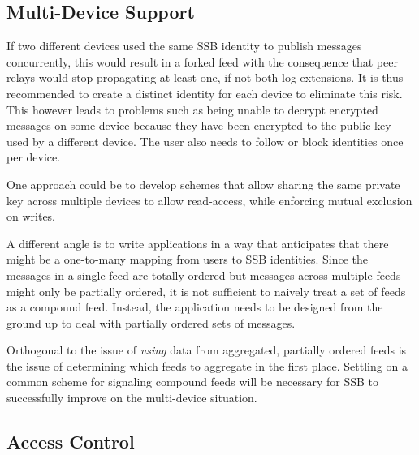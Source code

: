 \documentclass[10pt,sigconf]{acmart}
\begin{document}



\subsection{Multi-Device Support}

If two different devices used the same SSB identity to publish messages concurrently, this would result in a forked feed with the consequence that peer relays would stop propagating at least one, if not both log extensions. It is thus recommended to create a distinct identity for each device to eliminate this risk. This however leads to problems such as being unable to decrypt encrypted messages on some device because they have been encrypted to the public key used by a different device. The user also needs to follow or block identities once per device.

One approach could be to develop schemes that allow sharing the same private key across multiple devices to allow read-access, while enforcing mutual exclusion on writes.

A different angle is to write applications in a way that anticipates that there might be a one-to-many mapping from users to SSB identities. Since the messages in a single feed are totally ordered but messages across multiple feeds might only be partially ordered, it is not sufficient to naively treat a set of feeds as a compound feed. Instead, the application needs to be designed from the ground up to deal with partially ordered sets of messages.

Orthogonal to the issue of \textit{using} data from aggregated, partially ordered feeds is the issue of determining which feeds to aggregate in the first place. Settling on a common scheme for signaling compound feeds will be necessary for SSB to successfully improve on the multi-device situation.

\subsection{Access Control}
\end{document}
